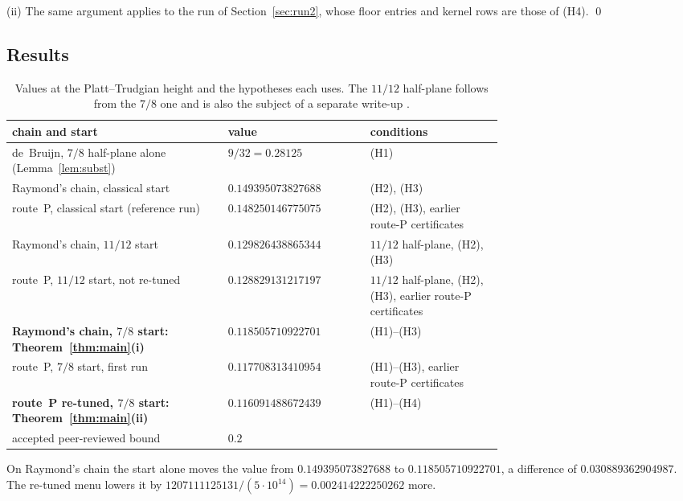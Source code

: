 \documentclass[11pt]{article}
\theoremstyle{definition}
\begin{document}
(ii) The same argument applies to the run of Section~\ref{sec:run2}, whose floor entries and
kernel rows are those of (H4). \qed

\subsection{Results}

\begin{table}[ht]
\centering
\small
\begin{tabular}{@{}>{\raggedright\arraybackslash}p{0.44\linewidth} l >{\raggedright\arraybackslash}p{0.27\linewidth}@{}}
\toprule
chain and start & value & conditions\\
\midrule
de~Bruijn, $7/8$ half-plane alone (Lemma~\ref{lem:subst}) & $9/32=0.28125$ & (H1)\\
Raymond's chain, classical start \cite{Raymond26} & $0.149395073827688$ & (H2), (H3)\\
route~P, classical start (reference run) & $0.148250146775075$ & (H2), (H3), earlier route-P certificates\\
Raymond's chain, $11/12$ start & $0.129826438865344$ & $11/12$ half-plane, (H2), (H3)\\
route~P, $11/12$ start, not re-tuned & $0.128829131217197$ & $11/12$ half-plane, (H2), (H3), earlier route-P certificates\\
\textbf{Raymond's chain, $7/8$ start: Theorem~\ref{thm:main}(i)} & $\mathbf{0.118505710922701}$ & (H1)--(H3)\\
route~P, $7/8$ start, first run & $0.117708313410954$ & (H1)--(H3), earlier route-P certificates\\
\textbf{route~P re-tuned, $7/8$ start: Theorem~\ref{thm:main}(ii)} & $\mathbf{0.116091488672439}$ & (H1)--(H4)\\
\midrule
accepted peer-reviewed bound \cite[Corollary~2]{PlattTrudgian21} & $0.2$ & \\
\bottomrule
\end{tabular}
\caption{Values at the Platt--Trudgian height and the hypotheses each uses. The $11/12$ half-plane follows
from the $7/8$ one and is also the subject of a separate write-up \cite{OpenAI26QRH1112}.}
\label{tab:values}
\end{table}

On Raymond's chain the start alone moves the value from $0.149395073827688$ to
$0.118505710922701$, a difference of $0.030889362904987$. The re-tuned menu lowers it by
$1207111125131/(5\cdot10^{14})=0.002414222250262$ more.
\end{document}
